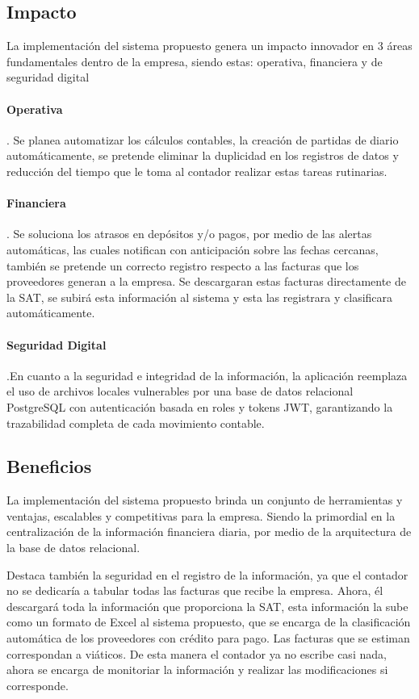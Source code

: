 \subsection{Impacto}

La implementación del sistema propuesto genera un impacto innovador en 3 áreas fundamentales dentro de la empresa, siendo estas: operativa, financiera y de seguridad digital

\paragraph{Operativa}. Se planea automatizar los cálculos contables, la creación de partidas de diario automáticamente, se pretende eliminar la duplicidad en los registros de datos y reducción del tiempo que le toma al contador realizar estas tareas rutinarias.

\paragraph{Financiera}. Se soluciona los atrasos en depósitos y/o pagos, por medio de las alertas automáticas, las cuales notifican con anticipación sobre las fechas cercanas, también se pretende un correcto registro respecto a las facturas que los proveedores generan a la empresa. Se descargaran estas facturas directamente de la SAT, se subirá esta información al sistema y esta las registrara y clasificara automáticamente.

\paragraph{Seguridad Digital}.En cuanto a la seguridad e integridad de la información, la aplicación reemplaza el uso de archivos locales vulnerables por una base de datos relacional PostgreSQL con autenticación basada en roles y tokens JWT, garantizando la trazabilidad completa de cada movimiento contable.

\subsection{Beneficios}

La implementación del sistema propuesto brinda un conjunto de herramientas y ventajas, escalables y competitivas para la empresa. Siendo la primordial en la centralización de la información financiera diaria, por medio de la arquitectura de la base de datos relacional.

Destaca también la seguridad en el registro de la información, ya que el contador no se dedicaría a tabular todas las facturas que recibe la empresa. Ahora, él descargará toda la información que proporciona la SAT, esta información la sube como un formato de Excel al sistema propuesto, que se encarga de la clasificación automática de los proveedores con crédito para pago. Las facturas que se estiman correspondan a viáticos. De esta manera el contador ya no escribe casi nada, ahora se encarga de monitoriar la información y realizar las modificaciones si corresponde.

